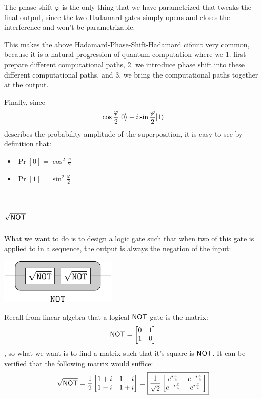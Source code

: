 \documentclass[12pt]{article}
\begin{document}
\begin{remark}
The phase shift $\varphi$ is the only thing that we have parametrized that tweaks the final output, since the two Hadamard gates simply opens and closes the interference and won't be parametrizable.

This makes the above Hadamard-Phase-Shift-Hadamard cifcuit very common, because it is a natural progression of quantum computation where we 1. first prepare different computational paths, 2. we introduce phase shift into these different computational paths, and 3. we bring the computational paths together at the output.
\end{remark}

\begin{remark}
Finally, since $$\cos\frac{\varphi}{2}\Ket{0} - i\sin\frac{\varphi}{2}\Ket{1}$$ describes the probability amplitude of the superposition, it is easy to see by definition that:
\begin{itemize}
    \item $\Pr[0] = \cos^2 \frac{\varphi}{2}$
    \item $\Pr[1] = \sin^2 \frac{\varphi}{2}$
\end{itemize}
\end{remark}

\section{$\sqrt{\NOT}$}
What we want to do is to design a logic gate such that when two of this gate is applied to in a sequence, the output is always the negation of the input:
\begin{center}
    \includegraphics[width = 15em]{images/5.jpg}
\end{center}

\begin{definition}[$\sqrt{\NOT}$]
Recall from linear algebra that a logical $\NOT$ gate is the matrix: $$
\NOT = \begin{bmatrix}
0 & 1\\
1 & 0
\end{bmatrix}
$$, so what we want is to find a matrix such that it's square is $\NOT$. It can be verified that the following matrix would suffice: $$
\sqrt{\NOT} = \frac{1}{2}\begin{bmatrix}
1+i & 1-i\\
1-i & 1+i
\end{bmatrix} = \boxed{\frac{1}{\sqrt{2}}\begin{bmatrix}
e^{i\frac{\pi}{4}} & e^{-i\frac{\pi}{4}}\\
e^{-i\frac{\pi}{4}} & e^{i\frac{\pi}{4}}
\end{bmatrix}}
$$
\end{definition}
\end{document}
